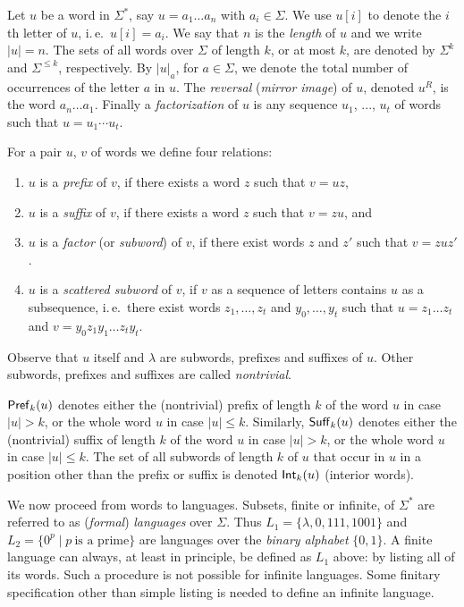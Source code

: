 Let $u$ be a word in $\Sigma^*$, say $u = a_1 \ldots a_n$ with $a_i \in \Sigma$. We use $u[i]$ to denote the $i$th letter of $u$, i.\,e.\ $u[i] = a_i$. We say that $n$ is the \emph{length} of $u$ and we write $|u|=n$. The sets of all words over $\Sigma$ of length $k$, or at most $k$, are denoted by $\Sigma^k$ and $\Sigma^{\le k}$, respectively. By $|u|_a$, for $a \in \Sigma$, we denote the total number of occurrences of the letter $a$ in $u$. The \emph{reversal} (\emph{mirror image}) of $u$, denoted $u^R$, is the word $a_n \ldots a_1$. Finally a \emph{factorization} of $u$ is any sequence $u_1$, ..., $u_t$ of words such that $u = u_1 \cdots u_t$.

For a pair $u$, $v$ of words we define four relations:

\begin{enumerate}
\item $u$ is a \emph{prefix} of $v$, if there exists a word $z$ such that $v = uz$,
\item $u$ is a \emph{suffix} of $v$, if there exists a word $z$ such that $v = zu$, and
\item $u$ is a \emph{factor} (or \emph{subword}) of $v$, if there exist words $z$ and $z'$ such that $v = zuz'$.
\item $u$ is a \emph{scattered subword} of $v$, if $v$ as a sequence of letters contains $u$ as a subsequence, i.\,e.\ there exist words $z_1, \ldots, z_t$ and $y_0, \ldots, y_t$ such that $u = z_1 \ldots z_t$ and $v = y_0 z_1 y_1 \ldots z_t y_t$.
\end{enumerate}

Observe that $u$ itself and $\lambda$ are subwords, prefixes and suffixes of $u$. Other subwords, prefixes and suffixes are called \emph{nontrivial}.

$\textup{\sf Pref\/}_k(u)$ denotes either the (nontrivial) prefix of length $k$ of the word $u$ in case $|u|>k$, or the whole word $u$ in case $|u|\le k$. Similarly, $\textup{\sf Suff\/}_k(u)$ denotes either the (nontrivial) suffix of length $k$ of the word $u$ in case $|u|>k$, or the whole word $u$ in case $|u|\le k$. The set of all subwords of length $k$ of $u$ that occur in $u$ in a position other than the prefix or suffix is denoted $\textup{\sf Int\/}_k(u)$ (interior words).

We now proceed from words to languages. Subsets, finite or infinite, of $\Sigma^*$ are referred to as (\emph{formal}) \emph{languages} over $\Sigma$. Thus $L_1 = \{\lambda, 0, 111, 1001\}$ and $L_2 = \{0^p \mid p \ \text{is a prime}\}$ are languages over the \emph{binary alphabet} $\{0, 1\}$. A finite language can always, at least in principle, be defined as $L_1$ above: by listing all of its words. Such a procedure is not possible for infinite languages. Some finitary specification other than simple listing is needed to define an infinite language.


